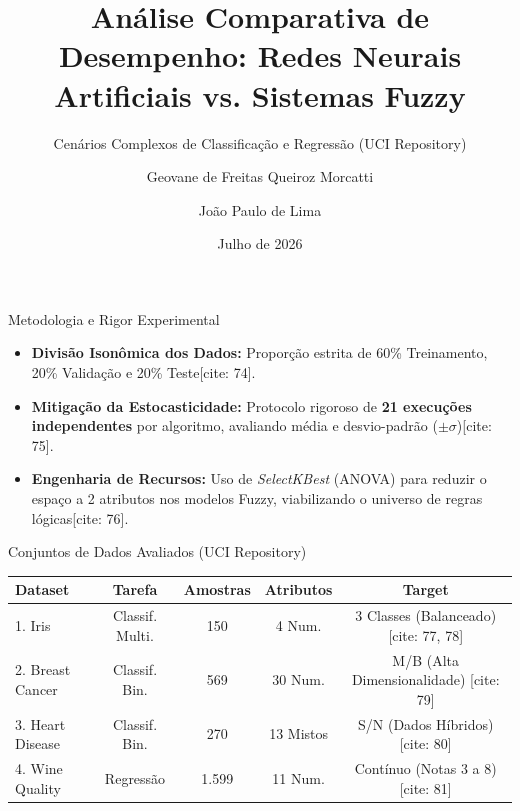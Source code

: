 \documentclass[10pt, aspectratio=169]{beamer}
\title[RNAs vs Sistemas Fuzzy]{Análise Comparativa de Desempenho: Redes Neurais Artificiais vs. Sistemas Fuzzy}
\subtitle{Cenários Complexos de Classificação e Regressão (UCI Repository)}
\author[G. Morcatti \and J. Lima]{Geovane de Freitas Queiroz Morcatti \and João Paulo de Lima}
\institute[CEFET-MG]{Centro Federal de Educação Tecnológica de Minas Gerais (CEFET-MG) \\ Mestrado em Modelagem Matemática e Computacional}
\date[Amanhã]{Julho de 2026}
\begin{document}
\begin{frame}
    \titlepage
\end{frame}

\begin{frame}{Metodologia e Rigor Experimental}
    \begin{itemize}
        \item \textbf{Divisão Isonômica dos Dados:} Proporção estrita de 60\% Treinamento, 20\% Validação e 20\% Teste[cite: 74].
        \item \textbf{Mitigação da Estocasticidade:} Protocolo rigoroso de \textbf{21 execuções independentes} por algoritmo, avaliando média e desvio-padrão ($\pm \sigma$)[cite: 75].
        \item \textbf{Engenharia de Recursos:} Uso de \textit{SelectKBest} (ANOVA) para reduzir o espaço a 2 atributos nos modelos Fuzzy, viabilizando o universo de regras lógicas[cite: 76].
    \end{itemize}
\end{frame}

\begin{frame}{Conjuntos de Dados Avaliados (UCI Repository)}
    \centering
    \small
    \begin{tabular}{lcccc}
        \toprule
        \textbf{Dataset} & \textbf{Tarefa} & \textbf{Amostras} & \textbf{Atributos} & \textbf{Target} \\
        \midrule
        1. Iris & Classif. Multi. & 150 & 4 Num. & 3 Classes (Balanceado) [cite: 77, 78] \\
        2. Breast Cancer & Classif. Bin. & 569 & 30 Num. & M/B (Alta Dimensionalidade) [cite: 79] \\
        3. Heart Disease & Classif. Bin. & 270 & 13 Mistos & S/N (Dados Híbridos) [cite: 80] \\
        4. Wine Quality & Regressão & 1.599 & 11 Num. & Contínuo (Notas 3 a 8) [cite: 81] \\
        \bottomrule
    \end{tabular}
\end{frame}
\end{document}
